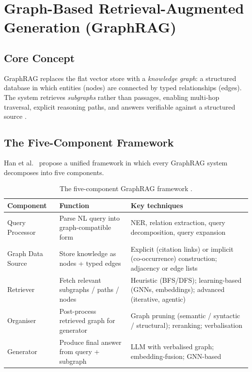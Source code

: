 \documentclass[12pt,a4paper,oneside]{report}
\begin{document}
\section{Graph-Based Retrieval-Augmented Generation (GraphRAG)}
\label{sec:lit_graphrag}

\subsection{Core Concept}

GraphRAG replaces the flat vector store with a \emph{knowledge graph}: a
structured database in which entities (nodes) are connected by typed
relationships (edges). The system retrieves \emph{subgraphs} rather than
passages, enabling multi-hop traversal, explicit reasoning paths, and
answers verifiable against a structured source \citep{han2025,peng2024}.

\subsection{The Five-Component Framework}

Han et al.~\citep{han2025} propose a unified framework in which every GraphRAG system
decomposes into five components.

\begin{table}[htbp]
\centering
\caption{The five-component GraphRAG framework \citep{han2025}.}
\label{tab:five_component}
\small
\begin{tabularx}{\textwidth}{@{}lXX@{}}
\toprule
\textbf{Component} & \textbf{Function} & \textbf{Key techniques} \\
\midrule
Query Processor   & Parse NL query into graph-compatible form    & NER, relation extraction, query decomposition, query expansion \\
Graph Data Source & Store knowledge as nodes + typed edges       & Explicit (citation links) or implicit (co-occurrence) construction; adjacency or edge lists \\
Retriever         & Fetch relevant subgraphs / paths / nodes     & Heuristic (BFS/DFS); learning-based (GNNs, embeddings); advanced (iterative, agentic) \\
Organiser         & Post-process retrieved graph for generator   & Graph pruning (semantic / syntactic / structural); reranking; verbalisation \\
Generator         & Produce final answer from query + subgraph   & LLM with verbalised graph; embedding-fusion; GNN-based \\
\bottomrule
\end{tabularx}
\end{table}
\end{document}

